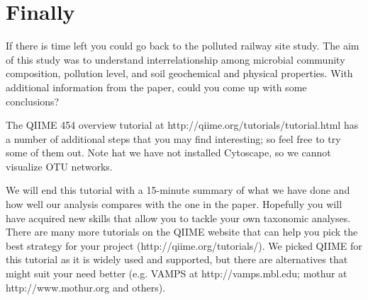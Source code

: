 \documentclass[a4paper,12pt,twoside]{memoir}
\begin{document}
\section{Finally}

\begin{information}
If there is time left you could go back to the polluted railway site study. The aim of this study was to understand interrelationship among microbial community composition, pollution level, and soil geochemical and physical properties. With additional information from the paper, could you come up with some conclusions?

The QIIME 454 overview tutorial at http://qiime.org/tutorials/tutorial.html has a number of additional steps that you may find interesting; so feel free to try some of them out. Note hat we have not installed Cytoscape, so we cannot visualize OTU networks.

We will end this tutorial with a 15-minute summary of what we have done and how well our analysis compares with the one in the paper.
Hopefully you will have acquired new skills that allow you to tackle your own taxonomic analyses. There are many more tutorials on the QIIME website that can help you pick the best strategy for your project (http://qiime.org/tutorials/). We picked QIIME for this tutorial as it is widely used and supported, but there are alternatives that might suit your need better (e.g. VAMPS at http://vamps.mbl.edu; mothur at http://www.mothur.org and others).
\end{information}
\end{document}
